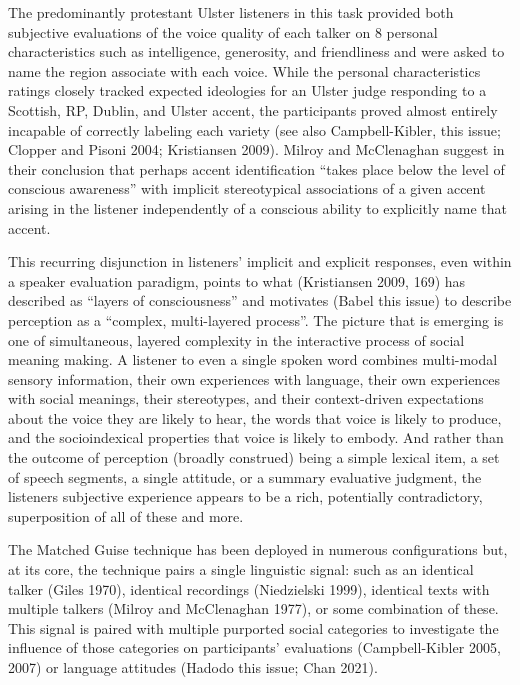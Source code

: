 \documentclass[
  letterpaper,
  DIV=11,
  numbers=noendperiod]{scrartcl}
\begin{document}
The predominantly protestant Ulster listeners in this task provided both
subjective evaluations of the voice quality of each talker on 8 personal
characteristics such as intelligence, generosity, and friendliness and
were asked to name the region associate with each voice. While the
personal characteristics ratings closely tracked expected ideologies for
an Ulster judge responding to a Scottish, RP, Dublin, and Ulster accent,
the participants proved almost entirely incapable of correctly labeling
each variety (see also Campbell-Kibler, this issue; Clopper and Pisoni
2004; Kristiansen 2009). Milroy and McClenaghan suggest in their
conclusion that perhaps accent identification ``takes place below the
level of conscious awareness'' with implicit stereotypical associations
of a given accent arising in the listener independently of a conscious
ability to explicitly name that accent.

This recurring disjunction in listeners' implicit and explicit
responses, even within a speaker evaluation paradigm, points to what
(Kristiansen 2009, 169) has described as ``layers of consciousness'' and
motivates (Babel this issue) to describe perception as a ``complex,
multi-layered process''. The picture that is emerging is one of
simultaneous, layered complexity in the interactive process of social
meaning making. A listener to even a single spoken word combines
multi-modal sensory information, their own experiences with language,
their own experiences with social meanings, their stereotypes, and their
context-driven expectations about the voice they are likely to hear, the
words that voice is likely to produce, and the socioindexical properties
that voice is likely to embody. And rather than the outcome of
perception (broadly construed) being a simple lexical item, a set of
speech segments, a single attitude, or a summary evaluative judgment,
the listeners subjective experience appears to be a rich, potentially
contradictory, superposition of all of these and more.

The Matched Guise technique has been deployed in numerous configurations
but, at its core, the technique pairs a single linguistic signal: such
as an identical talker (Giles 1970), identical recordings (Niedzielski
1999), identical texts with multiple talkers (Milroy and McClenaghan
1977), or some combination of these. This signal is paired with multiple
purported social categories to investigate the influence of those
categories on participants' evaluations (Campbell-Kibler 2005, 2007) or
language attitudes (Hadodo this issue; Chan 2021).
\end{document}

